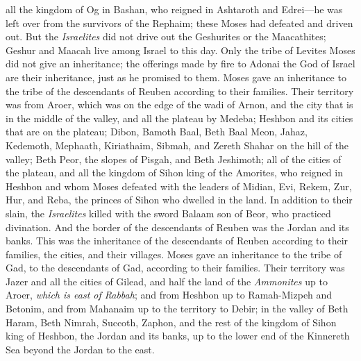 \begin{biblechapter}
\verse all the kingdom of Og in Bashan, who reigned in Ashtaroth and Edrei—he was left over from the survivors of the Rephaim; these Moses had defeated and driven out.
\verse But the \textit{Israelites} did not drive out the Geshurites or the Maacathites; Geshur and Maacah live among Israel to this day.
\verse Only the tribe of Levites Moses did not give an inheritance; the offerings made by fire to Adonai the God of Israel are their inheritance, just as he promised to them.
 Moses gave an inheritance to the tribe of the descendants of Reuben according to their families.
\verse Their territory was from Aroer, which was on the edge of the wadi of Arnon, and the city that is in the middle of the valley, and all the plateau by Medeba;
\verse Heshbon and its cities that are on the plateau; Dibon, Bamoth Baal, Beth Baal Meon,
\verse Jahaz, Kedemoth, Mephaath,
\verse Kiriathaim, Sibmah, and Zereth Shahar on the hill of the valley;
\verse Beth Peor, the slopes of Pisgah, and Beth Jeshimoth;
\verse all of the cities of the plateau, and all the kingdom of Sihon king of the Amorites, who reigned in Heshbon and whom Moses defeated with the leaders of Midian, Evi, Rekem, Zur, Hur, and Reba, the princes of Sihon who dwelled in the land.
\verse In addition to their slain, the \textit{Israelites} killed with the sword Balaam son of Beor, who practiced divination.
\verse And the border of the descendants of Reuben was the Jordan and its banks. This was the inheritance of the descendants of Reuben according to their families, the cities, and their villages.
 Moses gave an inheritance to the tribe of Gad, to the descendants of Gad, according to their families.
\verse Their territory was Jazer and all the cities of Gilead, and half the land of the \textit{Ammonites} up to Aroer, \textit{which is east of Rabbah};
\verse and from Heshbon up to Ramah-Mizpeh and Betonim, and from Mahanaim up to the territory to Debir;
\verse in the valley of Beth Haram, Beth Nimrah, Succoth, Zaphon, and the rest of the kingdom of Sihon king of Heshbon, the Jordan and its banks, up to the lower end of the Kinnereth Sea beyond the Jordan to the east.

\end{biblechapter}
